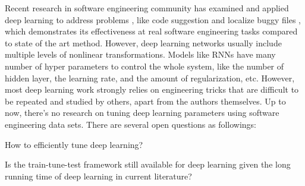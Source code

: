 Recent research in software engineering community has examined and applied deep learning to address problems
, like code suggestion \cite{white2015toward} and localize buggy files \cite{lam2015combining}, which demonstrates its effectiveness at real software engineering tasks compared to state of the art method. However, deep learning networks usually include multiple levels of nonlinear transformations\cite{bengio2009learning}. Models like RNNs have many number of hyper parameters to control the whole system, like the number of hidden layer, the learning rate, and the amount of regularization, etc. However, most deep learning work strongly relies on engineering tricks that are difficult to be repeated and studied by others, apart from the authors themselves\cite{zhou2014big}. Up to now, there's no research on tuning deep learning parameters using software engineering data sets. There are several open questions as followings:
\bi
\item How to efficiently tune deep learning? 
\item Is the train-tune-test framework still available for deep learning given the long running time of deep learning in current literature?
\ei
